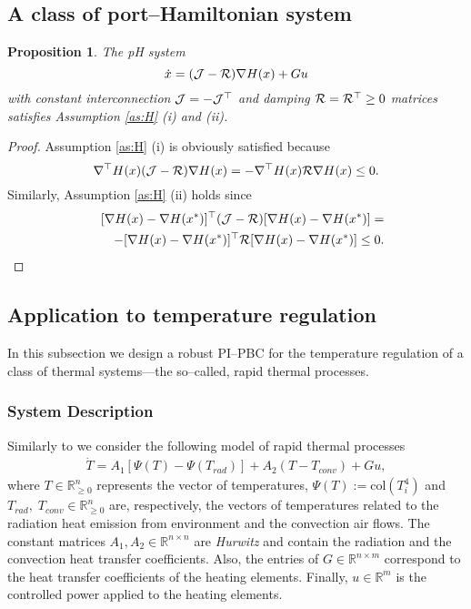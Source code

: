 \documentclass[10pt, conference]{ieeeconf}
\newtheorem{proposition}{Proposition}
\newcommand{\col}{ \mbox{col} }
\def\begequarrs{\begin{eqnarray*}}
\def\endequarrs{\end{eqnarray*}}
\def\lab{\label}
\begin{document}
\subsection{A class of port--Hamiltonian system}
\lab{subsec61}	
\begin{proposition}
The pH system
\begin{equation}\label{phsys}
\dot{x}  =   ({\cal J} -{\cal R} ) \nabla H(x) + Gu
\end{equation}
with {\em constant} interconnection  ${\cal J}=-{\cal J}^\top$ and damping ${\cal R}={\cal R}^\top \geq 0$ matrices satisfies Assumption \ref{as:H} (i) and (ii).
\end{proposition}
\begin{proof}
Assumption  \ref{as:H}  (i) is obviously satisfied because
$$
 \nabla^\top H(x) ({\cal J} -{\cal R} )\nabla H(x) =- \nabla^\top H(x) {\cal R} \nabla H(x) \leq 0.
$$
Similarly, Assumption  \ref{as:H}  (ii) holds since
\begequarrs
&&[ \nabla H(x)- \nabla H(x^*)]^\top  ({\cal J} -{\cal R} )[\nabla H(x)- \nabla H(x^*)] =\\
&& -[ \nabla H(x)- \nabla H(x^*)]^\top {\cal R} [\nabla H(x)- \nabla H(x^*)]\leq 0.
\endequarrs
\end{proof}
\subsection{Application to temperature regulation}
\lab{subsec62}	
In this subsection we design a robust PI--PBC for the temperature regulation of a class of thermal systems---the so--called, rapid thermal processes.
\subsubsection{System Description}
Similarly to \cite{ebert2004model, schaper1992modeling} we consider the following model of rapid thermal processes
\begin{equation} \label{tsys}
	\begin{aligned}
		\dot{T} = A_1 \left[\Psi(T)-\Psi(T_{rad})\right]+A_2 \left(T-T_{conv} \right) +Gu,   
	\end{aligned}
\end{equation} 
where $T\in \mathbb{R}^n_{\geq 0}$  represents the vector of temperatures, ${\Psi(T):=\col(T_i^4)}$ and  $T_{rad},\;T_{conv} \in \mathbb{R}^n_{\geq 0}$  are, respectively, the vectors of temperatures related to the radiation heat emission from environment and the convection air flows. 
The constant matrices  $A_1,A_2\in\mathbb{R}^{n\times n}$ are {\em Hurwitz}  and contain the radiation and the convection heat transfer coefficients. Also, the entries of  $G\in\mathbb{R}^{n\times m}$ correspond to the heat transfer coefficients of the heating elements. Finally, $u\in \mathbb{R}^m$ is the controlled power applied to the heating elements. 
\end{document}
